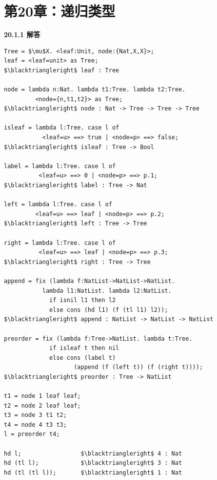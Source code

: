 \newpage
\section{第20章：递归类型}

\begin{taplauthorsolutionentrybox}
\label{sol:author:20.1.1}
\textbf{20.1.1 解答}

\begin{lstlisting}[mathescape=true]
Tree = $\mu$X. <leaf:Unit, node:{Nat,X,X}>;
leaf = <leaf=unit> as Tree;
$\blacktriangleright$ leaf : Tree

node = lambda n:Nat. lambda t1:Tree. lambda t2:Tree.
         <node={n,t1,t2}> as Tree;
$\blacktriangleright$ node : Nat -> Tree -> Tree -> Tree

isleaf = lambda l:Tree. case l of
           <leaf=u> ==> true | <node=p> ==> false;
$\blacktriangleright$ isleaf : Tree -> Bool

label = lambda l:Tree. case l of
          <leaf=u> ==> 0 | <node=p> ==> p.1;
$\blacktriangleright$ label : Tree -> Nat

left = lambda l:Tree. case l of
         <leaf=u> ==> leaf | <node=p> ==> p.2;
$\blacktriangleright$ left : Tree -> Tree

right = lambda l:Tree. case l of
          <leaf=u> ==> leaf | <node=p> ==> p.3;
$\blacktriangleright$ right : Tree -> Tree

append = fix (lambda f:NatList->NatList->NatList.
           lambda l1:NatList. lambda l2:NatList.
             if isnil l1 then l2
             else cons (hd l1) (f (tl l1) l2));
$\blacktriangleright$ append : NatList -> NatList -> NatList

preorder = fix (lambda f:Tree->NatList. lambda t:Tree.
             if isleaf t then nil
             else cons (label t)
                    (append (f (left t)) (f (right t))));
$\blacktriangleright$ preorder : Tree -> NatList

t1 = node 1 leaf leaf;
t2 = node 2 leaf leaf;
t3 = node 3 t1 t2;
t4 = node 4 t3 t3;
l = preorder t4;

hd l;                 $\blacktriangleright$ 4 : Nat
hd (tl l);            $\blacktriangleright$ 3 : Nat
hd (tl (tl l));       $\blacktriangleright$ 1 : Nat
\end{lstlisting}

\end{taplauthorsolutionentrybox}

